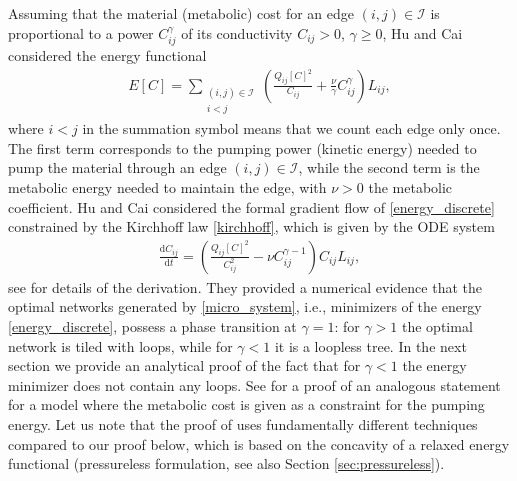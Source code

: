 \documentclass{article}
\numberwithin{equation}{section}
\begin{document}
Assuming that the material (metabolic) cost for an edge $(i,j)\in \mathcal{I}$ is proportional to a power $C_{ij}^\gamma$ of its conductivity $C_{ij}>0$, $\gamma \geq 0$,
Hu and Cai \cite{hu2013adaptation} considered the energy functional
\begin{align}\label{energy_discrete}
   E[C] = \sum_{\substack{(i,j)\in \mathcal{I}\\i< j}} \left( \frac{Q_{ij}[C]^2 }{C_{ij}} + \frac{\nu}{\gamma} C_{ij}^\gamma \right) L_{ij},
\end{align}
where $i<j$ in the summation symbol means that we count each edge only once.
The first term corresponds to the pumping power (kinetic energy) needed to pump the material through an edge $(i,j)\in \mathcal{I}$,
while the second term is the metabolic energy needed to maintain the edge, with $\nu>0$ the metabolic coefficient.
Hu and Cai considered the formal gradient flow of \eqref{energy_discrete} constrained by the Kirchhoff law \eqref{kirchhoff}, which is given by the ODE system
\begin{align}\label{micro_system}
   \frac{\mathrm{d}C_{ij}}{\mathrm{d}t} = \left(\frac{Q_{ij}[C]^2 }{C_{ij}^2}-\nu C_{ij}^{\gamma-1}\right) C_{ij} L_{ij},
\end{align}
see \cite{HKM} for details of the derivation.
They provided a numerical evidence that the optimal networks generated by \eqref{micro_system},
i.e., minimizers of the energy \eqref{energy_discrete}, possess a phase transition at $\gamma = 1$:
for $\gamma>1$ the optimal network is tiled with loops, while for $\gamma <1$ it is a loopless tree.
In the next section we provide an analytical proof of the fact that for $\gamma <1$ the energy minimizer
does not contain any loops.
See \cite{Banavar} for a proof of an analogous statement for a model where the metabolic cost is given
as a constraint for the pumping energy. Let us note that the proof of \cite{Banavar} uses fundamentally different
techniques compared to our proof below, which is based on the concavity of a relaxed energy functional
(pressureless formulation, see also Section \ref{sec:pressureless}).


\end{document}
